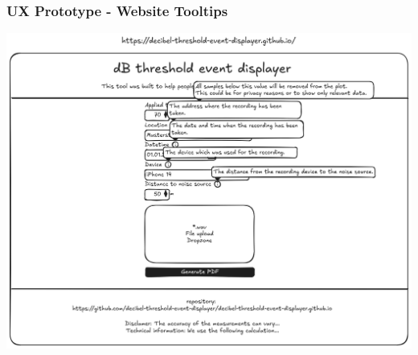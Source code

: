 \begin{frame}
    \frametitle{UX Prototype - Website Tooltips}
    \centering
    \includegraphics[width=0.65\linewidth]{../assets/ux_prototype_website_tooltips.png}
\end{frame}
